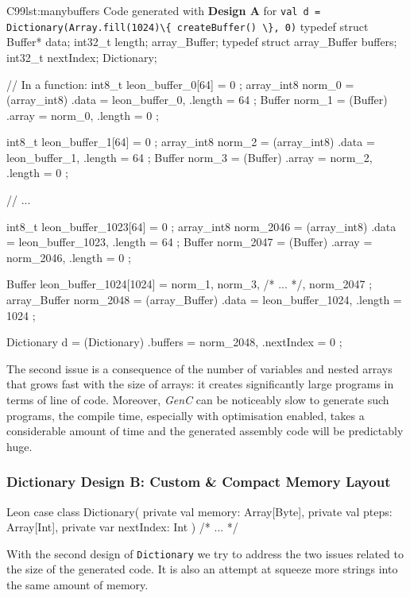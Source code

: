 \documentclass[a4paper,twoside]{article}
\newcommand{\InlineS}[1]{\lstinline[language=Leon]|#1|}
\newcommand{\GenC}{\emph{GenC}\xspace}
\begin{document}
\begin{Code}{C99}{lst:manybuffers}{%
Code generated with \textbf{Design A} for %
\InlineS{val d = Dictionary(Array.fill(1024)\{ createBuffer() \}, 0)}}
typedef struct { Buffer* data; int32_t length; } array_Buffer;
typedef struct { array_Buffer buffers; int32_t nextIndex; } Dictionary;

// In a function:
int8_t leon_buffer_0[64] = { 0 };
array_int8 norm_0 = (array_int8) { .data = leon_buffer_0, .length = 64 };
Buffer norm_1 = (Buffer) { .array = norm_0, .length = 0 };

int8_t leon_buffer_1[64] = { 0 };
array_int8 norm_2 = (array_int8) { .data = leon_buffer_1, .length = 64 };
Buffer norm_3 = (Buffer) { .array = norm_2, .length = 0 };

// ...

int8_t leon_buffer_1023[64] = { 0 };
array_int8 norm_2046 =
    (array_int8) { .data = leon_buffer_1023, .length = 64 };
Buffer norm_2047 = (Buffer) { .array = norm_2046, .length = 0 };

Buffer leon_buffer_1024[1024] = { norm_1, norm_3, /* ... */, norm_2047 };
array_Buffer norm_2048 =
    (array_Buffer) { .data = leon_buffer_1024, .length = 1024 };

Dictionary d = (Dictionary) { .buffers = norm_2048, .nextIndex = 0 };
\end{Code}

The second issue is a consequence of the number of variables and nested arrays
that grows fast with the size of arrays: it creates significantly large programs
in terms of line of code. Moreover, \GenC can be noticeably slow to generate
such programs, the compile time, especially with optimisation enabled, takes a
considerable amount of time and the generated assembly code will be predictably
huge.

\subsubsection*{Dictionary Design B: Custom \& Compact Memory Layout}

\begin{ShortCode}{Leon}
case class Dictionary(
  private val memory: Array[Byte],
  private val pteps: Array[Int],
  private var nextIndex: Int
) { /* ... */ }
\end{ShortCode}

With the second design of \InlineS{Dictionary} we try to address the two issues
related to the size of the generated code. It is also an attempt at squeeze more
strings into the same amount of memory.
\end{document}
